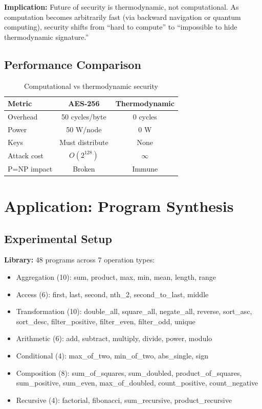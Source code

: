 \documentclass[twocolumn,10pt]{article}
\theoremstyle{definition}
\theoremstyle{remark}
\begin{document}
\vspace{0.2cm}
\noindent\textbf{Implication:} Future of security is thermodynamic, not computational. As computation becomes arbitrarily fast (via backward navigation or quantum computing), security shifts from ``hard to compute'' to ``impossible to hide thermodynamic signature.''

\subsection{Performance Comparison}

\begin{table}[h]
\centering
\small
\begin{tabular}{lcc}
\hline
\textbf{Metric} & \textbf{AES-256} & \textbf{Thermodynamic} \\
\hline
Overhead & 50 cycles/byte & 0 cycles \\
Power & 50 W/node & 0 W \\
Keys & Must distribute & None \\
Attack cost & $O(2^{128})$ & $\infty$ \\
P=NP impact & Broken & Immune \\
\hline
\end{tabular}
\caption{Computational vs thermodynamic security}
\end{table}

\section{Application: Program Synthesis}
\label{sec:synthesis}

\subsection{Experimental Setup}

\textbf{Library:} 48 programs across 7 operation types:
\begin{itemize}
\item Aggregation (10): sum, product, max, min, mean, length, range
\item Access (6): first, last, second, nth\_2, second\_to\_last, middle
\item Transformation (10): double\_all, square\_all, negate\_all, reverse, sort\_asc, sort\_desc, filter\_positive, filter\_even, filter\_odd, unique
\item Arithmetic (6): add, subtract, multiply, divide, power, modulo
\item Conditional (4): max\_of\_two, min\_of\_two, abs\_single, sign
\item Composition (8): sum\_of\_squares, sum\_doubled, product\_of\_squares, sum\_positive, sum\_even, max\_of\_doubled, count\_positive, count\_negative
\item Recursive (4): factorial, fibonacci, sum\_recursive, product\_recursive
\end{itemize}
\end{document}
